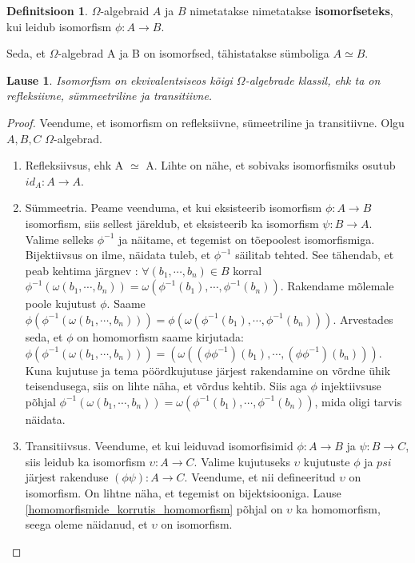 \documentclass[12pt]{report}
\numberwithin{equation}{section}
\theoremstyle{definition}
\newtheorem{isomorfsus}[equation]{Definitsioon}
\theoremstyle{plain}
\newtheorem{isomorfsus_on_ekvivalents}[equation]{Lause}
\begin{document}
\begin{isomorfsus}
$\Omega$-algebraid $A$ ja $B$ nimetatakse nimetatakse \textbf{isomorfseteks}, kui leidub isomorfism $\phi: A \to B$.
\end{isomorfsus}

Seda, et $\Omega$-algebrad A ja B on isomorfsed, tähistatakse s\"umboliga $A \simeq B$.

\begin{isomorfsus_on_ekvivalents}
Isomorfism on ekvivalentsiseos kõigi $\Omega$-algebrade klassil, ehk ta on refleksiivne, s\"ummeetriline ja transitiivne. 
\end{isomorfsus_on_ekvivalents}

\begin{proof}
Veendume, et isomorfism on refleksiivne, s\"umeetriline ja transitiivne. Olgu $A,B,C$ $\Omega$-algebrad. 
\begin{enumerate}[I]
\item Refleksiivsus, ehk A $\simeq$ A. Lihte on nähe, et sobivaks isomorfismiks osutub $id_A: A \to A$.
\item S\"ummeetria. Peame veenduma, et kui eksisteerib isomorfism $ \phi : A \rightarrow B$ isomorfism, siis sellest järeldub, et eksisteerib ka isomorfism $ \psi : B \rightarrow A$. Valime selleks $\phi^{-1}$ ja näitame, et tegemist on tõepoolest isomorfismiga. Bijektiivsus on ilme, näidata tuleb, et $\phi^{-1}$ säilitab tehted. See tähendab, et peab kehtima järgnev : $\forall (b_1,\cdots,b_n) \in B$ korral $\phi^{-1} (\omega(b_1,\cdots, b_n)) = \omega(\phi^{-1}(b_1), \cdots, \phi^{-1}(b_n))$. Rakendame mõlemale poole kujutust $\phi$. Saame $\phi \left( \phi^{-1}(\omega(b_1,\cdots, b_n)) \right) = \phi \left( \omega \left( \phi^{-1}(b_1), \cdots, \phi^{-1}(b_n) \right) \right)$. Arvestades seda, et $\phi$ on homomorfism saame kirjutada: $ \phi \left( \phi^{-1}(\omega(b_1,\cdots, b_n)) \right) = \left( \omega \left( \left( \phi  \phi^{-1} \right) (b_1), \cdots, \left( \phi \phi^{-1} \right) (b_n) \right) \right)$. Kuna kujutuse ja tema pöördkujutuse järjest rakendamine on võrdne \"uhik teisendusega, siis on lihte näha, et võrdus kehtib. Siis aga $\phi$ injektiivsuse põhjal $\phi^{-1} (\omega(b_1,\cdots, b_n)) = \omega(\phi^{-1}(b_1), \cdots, \phi^{-1}(b_n))$, mida oligi tarvis näidata.
\item Transitiivsus. Veendume, et kui leiduvad isomorfisimid $\phi: A \to B$ ja $\psi: B \to C$, siis leidub ka isomorfism $\upsilon: A \to C$. Valime kujutuseks $\upsilon$ kujutuste $\phi$ ja $psi$ järjest rakenduse $(\phi \psi): A \to C$. Veendume, et nii defineeritud $\upsilon$ on isomorfism. On lihtne näha, et tegemist on bijektsiooniga.     
Lause \ref{homomorfismide_korrutis_homomorfism} põhjal on $\upsilon$ ka homomorfism, seega oleme näidanud, et $\upsilon$ on isomorfism.
\end{enumerate}
\end{proof}
\end{document}
